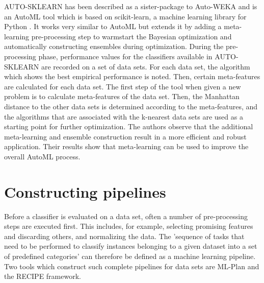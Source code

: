 AUTO-SKLEARN has been described as a sister-package to Auto-WEKA and is an AutoML tool which is based on scikit-learn, a machine learning library for Python \cite{feurer2015efficient}. It works very similar to AutoML but extends it by adding a meta-learning pre-processing step to warmstart the Bayesian optimization and automatically constructing ensembles during optimization. During the pre-processing phase, performance values for the classifiers available in AUTO-SKLEARN are recorded on a set of data sets. For each data set, the algorithm which shows the best empirical performance is noted. Then, certain meta-features are calculated for each data set. The first step of the tool when given a new problem is to calculate meta-features of the data set. Then, the Manhattan distance to the other data sets is determined according to the meta-features, and the algorithms that are associated with the k-nearest data sets are used as a starting point for further optimization. The authors observe that the additional meta-learning and ensemble construction result in a more efficient and robust application. Their results show that meta-learning can be used to improve the overall AutoML process.\\

\section{Constructing pipelines}
Before a classifier is evaluated on a data set, often a number of pre-processing steps are executed first. This includes, for example, selecting promising features and discarding others, and normalizing the data. The 'sequence of tasks that need to be performed to classify instances belonging to a given dataset into a set of predefined categories' \cite{DBLP:conf/eurogp/SaPOP17} can therefore be defined as a machine learning pipeline. Two tools which construct such complete pipelines for data sets are ML-Plan and the RECIPE framework.

